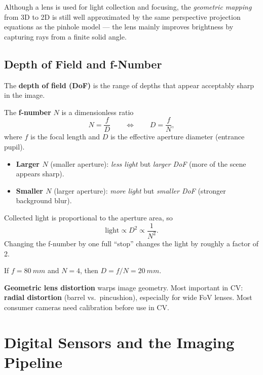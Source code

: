 \documentclass[11pt, oneside]{book}
\begin{document}
Although a lens is used for light collection and focusing, the \emph{geometric mapping} from 3D to 2D is
still well approximated by the same perspective projection equations as the pinhole model --- the lens
mainly improves brightness by capturing rays from a finite solid angle.

\subsection{Depth of Field and f-Number}

\begin{defbox}[title={Depth of Field}]
The \textbf{depth of field (DoF)} is the range of depths that appear acceptably sharp in the image.
\end{defbox}

\begin{thmbox}[title={f-Number}]
The \textbf{f-number} $N$ is a dimensionless ratio
\[
N=\frac{f}{D}
\qquad\Longleftrightarrow\qquad
D=\frac{f}{N},
\]
where $f$ is the focal length and $D$ is the effective aperture diameter (entrance pupil).
\end{thmbox}

\begin{itemize}
  \item \textbf{Larger $N$} (smaller aperture): \emph{less light} but \emph{larger DoF} (more of the scene appears sharp).
  \item \textbf{Smaller $N$} (larger aperture): \emph{more light} but \emph{smaller DoF} (stronger background blur).
\end{itemize}

Collected light is proportional to the aperture area, so
\[
\text{light} \propto D^2 \propto \frac{1}{N^2}.
\]
Changing the f-number by one full ``stop'' changes the light by roughly a factor of 2.

\begin{exbox}[title={f-Number Calculation}]
If $f=\SI{80}{mm}$ and $N=4$, then $D=f/N=\SI{20}{mm}$.
\end{exbox}

\begin{defbox}[title={Geometric Lens Distortion}]
\textbf{Geometric lens distortion} warps image geometry. Most important in CV: \textbf{radial distortion}
(barrel vs.\ pincushion), especially for wide FoV lenses. Most consumer cameras need calibration before use in CV.
\end{defbox}

\section{Digital Sensors and the Imaging Pipeline}
\end{document}
